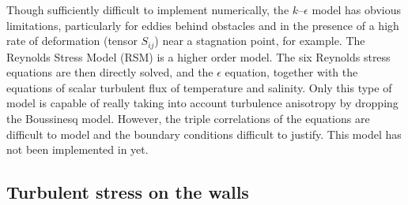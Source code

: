 Though sufficiently difficult to implement numerically, the $k$--$\epsilon$
model has obvious limitations, particularly for eddies behind obstacles and in
the presence of a high rate of deformation (tensor $S_{ij}$) near a stagnation
point, for example. The Reynolds Stress Model (RSM) is a higher order model. The six
Reynolds stress%
equations are then directly solved, and the $\epsilon$ equation, together
with the equations of scalar turbulent flux of temperature and salinity. Only
this type of model is capable of really taking into account turbulence
anisotropy by dropping the Boussinesq model. However, the triple
correlations of the equations are difficult to model and the boundary
conditions difficult to justify. This model has not been implemented in  yet.

\subsection{\label{contraintes turbulentes}Turbulent stress on the walls}

